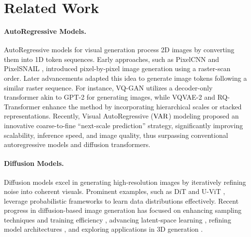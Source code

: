 \section{Related Work}\label{sec:related_work}

\paragraph{AutoRegressive Models.} AutoRegressive models for visual generation \cite{dyh+21,dzht22} process 2D images by converting them into 1D token sequences. Early approaches, such as PixelCNN \cite{vke+16} and PixelSNAIL \cite{cmr+18}, introduced pixel-by-pixel image generation using a raster-scan order. Later advancements \cite{rvav19,ero21,lkk+22} adapted this idea to generate image tokens following a similar raster sequence. For instance, VQ-GAN \cite{ero21} utilizes a decoder-only transformer akin to GPT-2 for generating images, while VQVAE-2 \cite{rvav19} and RQ-Transformer \cite{lkk+22} enhance the method by incorporating hierarchical scales or stacked representations. Recently, Visual AutoRegressive ($\mathrm{VAR}$) modeling \cite{tjy+24} proposed an innovative coarse-to-fine ``next-scale prediction'' strategy, significantly improving scalability, inference speed, and image quality, thus surpassing conventional autoregressive models and diffusion transformers.

\paragraph{Diffusion Models.} Diffusion models \cite{hja20,rbl+22} excel in generating high-resolution images by iteratively refining noise into coherent visuals. Prominent examples, such as DiT \cite{px23} and U-ViT \cite{bnx+23}, leverage probabilistic frameworks to learn data distributions effectively. Recent progress in diffusion-based image generation has focused on enhancing sampling techniques and training efficiency \cite{se19,sme20,lzb+22,hwl+24,cgl+25_high,ssz+25_dit}, advancing latent-space learning \cite{rbl+22,wsd+24,wxz+24,lzw+24}, refining model architectures \cite{hsc+22,px23,lsss24,wcz+23,xsg+24}, and exploring applications in 3D generation \cite{pjbm22,wlw+24,xlc+24,cgl+25_text}.



